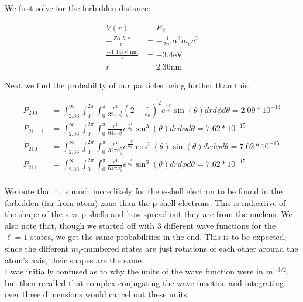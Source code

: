 \documentclass[10pt]{article} %
\begin{document}
We first solve for the forbidden distance:

\begin{align*}
  V(r) &= E_2\\
  -\frac{Z\alpha\hslash c}{r} &= -\frac{1}{2n^2}\alpha^2m_ec^2\\
  \frac{-1.44 \mbox{eV nm}}{r} &= -3.4 \mbox{eV}\\
  r &= 2.36 \mbox{nm}
\end{align*}

Next we find the probability of our particles being further than this:

\begin{align*}
  P_{200} &= \int_{2.36}^\infty \int_0^{2\pi} \int_0^\pi
  \frac{r^2}{32\pi a_0^3}\left(2-\frac{r}{a_0}\right)^2e^{\frac{-r}{a_0}}
  \sin(\theta)drd\phi d\theta = 2.09*10^{-14}\\
  P_{21-1} &= \int_{2.36}^\infty \int_0^{2\pi} \int_0^\pi
  \frac{r^4}{64\pi a_0^5}e^{\frac{-r}{a_0}}\sin^3(\theta)
  drd\phi d\theta = 7.62*10^{-15}\\
  P_{210} &= \int_{2.36}^\infty \int_0^{2\pi} \int_0^\pi
  \frac{r^4}{32\pi a_0^5}e^{\frac{-r}{a_0}}\cos^2(\theta)
  \sin(\theta)drd\phi d\theta = 7.62*10^{-15}\\
  P_{211} &= \int_{2.36}^\infty \int_0^{2\pi} \int_0^\pi
  \frac{r^4}{64\pi a_0^5}e^{\frac{-r}{a_0}}\sin^3(\theta)
  drd\phi d\theta = 7.62*10^{-15}\\
\end{align*}

We note that it is much more likely for the s-shell electron to be found in the forbidden (far
from atom) zone than the p-shell electrons. This is indicative of the shape of the s vs p shells
and how spread-out they are from the nucleus. We also note that, though we started off with 3
different wave functions for the $\ell = 1$ states, we get the same probabilities in the end.
This is to be expected, since the different $m_\ell$-numbered states are just rotations of each
other around the atom's axis, their shapes are the same.\\

I was initially confused as to why the units of the wave function were in $m^{-3/2}$, but then
recalled that complex conjugating the wave function and integrating over three dimensions would
cancel out these units.\\
\end{document}
